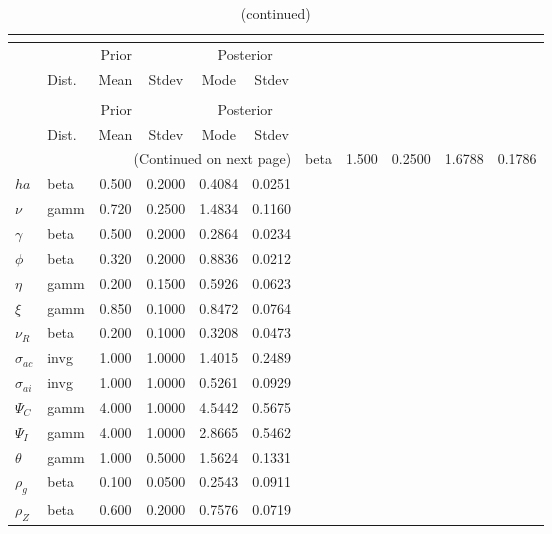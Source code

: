  
\begin{center}
\begin{longtable}{llcccc} 
\caption{Results from posterior maximization (parameters)}\\
 \label{Table:Posterior:1}\\
\toprule 
  & \multicolumn{3}{c}{Prior}  &  \multicolumn{2}{c}{Posterior} \\
  \cmidrule(r{.75em}){2-4} \cmidrule(r{.75em}){5-6}
  & Dist. & Mean  & Stdev & Mode & Stdev \\ 
\midrule \endfirsthead 
\caption{(continued)}\\
 \bottomrule 
  & \multicolumn{3}{c}{Prior}  &  \multicolumn{2}{c}{Posterior} \\
  \cmidrule(r{.75em}){2-4} \cmidrule(r{.75em}){5-6}
  & Dist. & Mean  & Stdev & Mode & Stdev \\ 
\midrule \endhead 
\bottomrule \multicolumn{6}{r}{(Continued on next page)}\endfoot 
\bottomrule\endlastfoot 
${\sigma}$ & beta &   1.500 & 0.2500 &   1.6788 &  0.1786 \\ 
${ha}$ & beta &   0.500 & 0.2000 &   0.4084 &  0.0251 \\ 
$\nu$ & gamm &   0.720 & 0.2500 &   1.4834 &  0.1160 \\ 
$\gamma$ & beta &   0.500 & 0.2000 &   0.2864 &  0.0234 \\ 
${\phi}$ & beta &   0.320 & 0.2000 &   0.8836 &  0.0212 \\ 
${\eta}$ & gamm &   0.200 & 0.1500 &   0.5926 &  0.0623 \\ 
$\xi$ & gamm &   0.850 & 0.1000 &   0.8472 &  0.0764 \\ 
${\nu_R}$ & beta &   0.200 & 0.1000 &   0.3208 &  0.0473 \\ 
${\sigma_{ac}}$ & invg &   1.000 & 1.0000 &   1.4015 &  0.2489 \\ 
${\sigma_{ai}}$ & invg &   1.000 & 1.0000 &   0.5261 &  0.0929 \\ 
${\Psi_{C}}$ & gamm &   4.000 & 1.0000 &   4.5442 &  0.5675 \\ 
${\Psi_I}$ & gamm &   4.000 & 1.0000 &   2.8665 &  0.5462 \\ 
${\theta}$ & gamm &   1.000 & 0.5000 &   1.5624 &  0.1331 \\ 
${\rho_g}$ & beta &   0.100 & 0.0500 &   0.2543 &  0.0911 \\ 
${\rho_Z}$ & beta &   0.600 & 0.2000 &   0.7576 &  0.0719 \\ 

\end{longtable}
\end{center}
